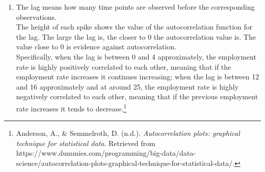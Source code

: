\documentclass[10pt]{article}
\begin{document}
\begin{enumerate}[1)]
\item
The lag means how many time points are observed before the corresponding observations.\\
The height of each spike shows the value of the autocorrelation function for the lag. The large the lag is, the closer to 0 the autocorrelation value is. The value close to 0 is evidence against autocorrelation.\\
Specifically, when the lag is between 0 and 4 approximately, the employment rate is highly positively correlated to each other, meaning that if the employment rate increases it continues increasing; when the lag is between 12 and 16 approximately and at around 25, the employment rate is highly negatively correlated to each other, meaning that if the previous employment rate increases it tends to decrease.\footnote{ Anderson, A., \& Semmelroth, D. (n.d.). \textit{Autocorrelation plots: graphical technique for statistical data}. Retrieved from https://www.dummies.com/programming/big-data/data-science/autocorrelation-plots-graphical-technique-for-statistical-data/.} %

\end{enumerate}
\vspace{3mm}
\end{document}
